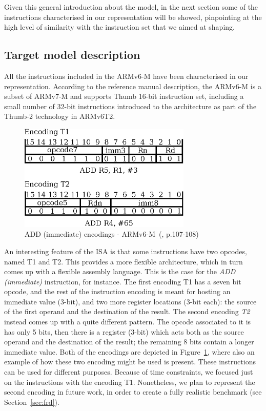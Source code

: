 \documentclass[conference]{IEEEtran}
\begin{document}
Given this general introduction about the model, in the next section some of the instructions
characterised in our representation will be showed, pinpointing at the high level of
similarity with the instruction set that we aimed at shaping.

\subsection{Target model description}
\label{sec:mod}
All the instructions included in the ARMv6-M have been characterised in our representation.
According to the reference manual description, the ARMv6-M is a subset of ARMv7-M and
supports Thumb 16-bit instruction set, including a small number of 32-bit instructions
introduced to the architecture as part of the Thumb-2 technology in ARMv6T2. 

\begin{figure}[ht!]
\begin{center}
	\includegraphics[width=8.2cm]{IMG/encodings_ex.eps}
	\caption{ADD (immediate) encodings - ARMv6-M~(\cite{armManual}, p.107-108)}
	\label{fig:ADDEnc}
\end{center}
\end{figure}

An interesting feature of the ISA is that some instructions have two opcodes, named T1 and
T2. This provides a more flexible architecture, which in turn comes up with a
flexible assembly language. This is the case for the \textit{ADD (immediate)} instruction,
for instance. The first encoding T1 has a seven bit opcode, and the rest of the
instruction encoding is meant for hosting an immediate value (3-bit), and two more register
locations (3-bit each): the source of the first operand and the destination of the result.
The second encoding \textit{T2} instead comes up with a quite different pattern. The opcode
associated to it is has only 5 bits, then there is a register (3-bit) which acts both as the
source operand and the destination of the result; the remaining 8 bits contain a longer
immediate value. Both of the encodings are depicted in Figure~\ref{fig:ADDEnc},
where also an example of how these two encoding might be used is present. These
instructions can be used for different purposes. Because of time constraints, we focused just
on the instructions with the encoding T1. Nonetheless, we plan to represent the
second encoding in future work, in order to create a fully realistic benchmark (see 
Section~\ref{sec:frd}).\\
\end{document}
